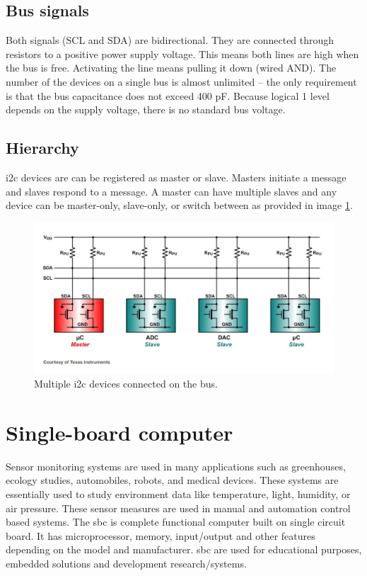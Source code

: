 \subsection{Bus signals} %
 \label{sub:bus_signals}
Both signals (SCL and SDA) are bidirectional. They are connected through resistors to a positive power supply voltage. This means both lines are high when the bus is free. Activating the line means pulling it down (wired AND). The number of the devices on a single bus is almost unlimited – the only requirement is that the bus capacitance does not exceed 400 pF. Because logical 1 level depends on the supply voltage, there is no standard bus voltage.\cite{i2c_bus_signal}
\subsection{Hierarchy} %
\label{sub:hierarchy}
\gls{i2c} devices are can be registered as master or slave. Masters initiate a message and
slaves respond to a message. A master can have multiple slaves and any device can
be master-only, slave-only, or switch between as provided in image \ref{fig:ch1}.
\begin{figure}[H]
\begin{center}
\captionsetup{font=small}
\includegraphics[scale=0.33]{pics/i2c_hierarchy.jpg}
\caption{Multiple \gls{i2c} devices connected on the bus.\cite{i2c_bus_pic}}
\label{fig:ch1}
\end{center}
\end{figure}

\section{Single-board computer}
Sensor monitoring systems are used in many applications such as greenhouses, ecology studies, automobiles, robots, and medical devices. These systems are essentially used to study environment data like temperature, light, humidity, or air pressure. These sensor measures are used in manual and automation control based systems\cite{6028693}. The \gls{sbc} is complete functional computer built on single circuit board. It has microprocessor, memory, input/output and other features depending on the model and manufacturer. \gls{sbc} are used for educational purposes, embedded solutions and development research/systems.
